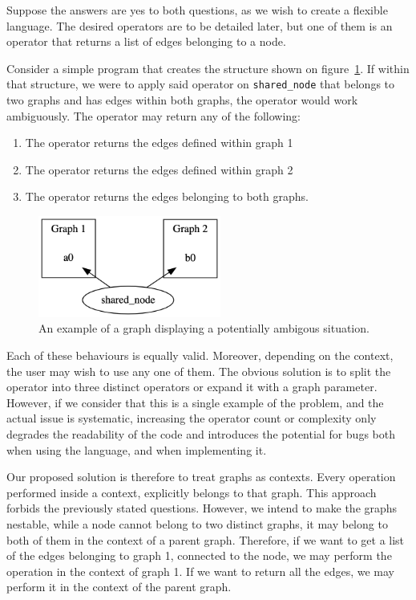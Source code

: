 Suppose the answers are yes to both questions, as we wish to create a flexible language.
The desired operators are to be detailed later, but one of them is an operator that returns a list of edges belonging to a node.

Consider a simple program that creates the structure shown on figure~\ref{fig:syntax_ambigous}.
If within that structure, we were to apply said operator on \lstinline{shared_node} that belongs to two graphs and has edges within both graphs,
the operator would work ambiguously.
The operator may return any of the following:

\begin{enumerate}
    \item The operator returns the edges defined within graph 1
    \item The operator returns the edges defined within graph 2
    \item The operator returns the edges belonging to both graphs.
\end{enumerate}

\begin{figure}[H]
    \centering
    \includegraphics[width=6cm]{figures/syntax_section/syntax_ambigous}
    \caption{An example of a graph displaying a potentially ambigous situation.}
    \label{fig:syntax_ambigous}
\end{figure}



Each of these behaviours is equally valid.
Moreover, depending on the context, the user may wish to use any one of them.
The obvious solution is to split the operator into three distinct operators or expand it with a graph parameter.
However, if we consider that this is a single example of the problem, and the actual issue is systematic,
increasing the operator count or complexity only degrades the readability of the code and introduces the potential for bugs
both when using the language, and when implementing it.

Our proposed solution is therefore to treat graphs as contexts.
Every operation performed inside a context, explicitly belongs to that graph.
This approach forbids the previously stated questions.
However, we intend to make the graphs nestable, while a node cannot belong to two distinct graphs,
it may belong to both of them in the context of a parent graph.
Therefore, if we want to get a list of the edges belonging to graph 1, connected to the node, we may perform the
operation in the context of graph 1.
If we want to return all the edges, we may perform it in the context of the parent graph.

